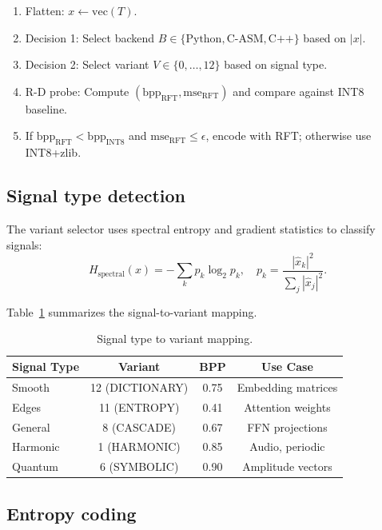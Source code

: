 \documentclass[aip,twocolumn,letterpaper]{revtex4}
\begin{document}
\begin{enumerate}
\item Flatten: \(x \gets \mathrm{vec}(T)\).
\item Decision 1: Select backend \(B \in \{\text{Python}, \text{C-ASM}, \text{C++}\}\) based on \(|x|\).
\item Decision 2: Select variant \(V \in \{0, \ldots, 12\}\) based on signal type.
\item R-D probe: Compute \((\mathrm{bpp}_\mathrm{RFT}, \mathrm{mse}_\mathrm{RFT})\) and compare against INT8 baseline.
\item If \(\mathrm{bpp}_\mathrm{RFT} < \mathrm{bpp}_\mathrm{INT8}\) and \(\mathrm{mse}_\mathrm{RFT} \le \epsilon\), encode with RFT; otherwise use INT8+zlib.
\end{enumerate}

\subsection{Signal type detection}

The variant selector uses spectral entropy and gradient statistics to classify signals:
\begin{equation}
H_\mathrm{spectral}(x) = -\sum_{k} p_k \log_2 p_k, \quad p_k = \frac{|\hat{x}_k|^2}{\sum_j |\hat{x}_j|^2}.
\label{eq:spectral-entropy}
\end{equation}

Table~\ref{tab:variants} summarizes the signal-to-variant mapping.

\begin{table}[t]
\caption{Signal type to variant mapping.}
\label{tab:variants}
\begin{ruledtabular}
\begin{tabular}{lccc}
Signal Type & Variant & BPP & Use Case \\
\hline
Smooth & 12 (DICTIONARY) & 0.75 & Embedding matrices \\
Edges & 11 (ENTROPY) & 0.41 & Attention weights \\
General & 8 (CASCADE) & 0.67 & FFN projections \\
Harmonic & 1 (HARMONIC) & 0.85 & Audio, periodic \\
Quantum & 6 (SYMBOLIC) & 0.90 & Amplitude vectors \\
\end{tabular}
\end{ruledtabular}
\end{table}

\subsection{Entropy coding}
\end{document}
